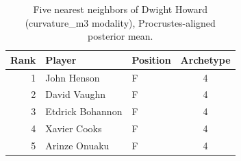 \begin{table}[htbp]
  \centering\small
  \begin{tabular}{rllc}
    \toprule
    Rank & Player & Position & Archetype \\
    \midrule
    1 & John Henson & F & 4 \\
    2 & David Vaughn & F & 4 \\
    3 & Etdrick Bohannon & F & 4 \\
    4 & Xavier Cooks & F & 4 \\
    5 & Arinze Onuaku & F & 4 \\
    \bottomrule
  \end{tabular}
  \caption{Five nearest neighbors of Dwight Howard (curvature_m3 modality), Procrustes-aligned posterior mean.}
  \label{tab:Dwight_Howard_neighbors_curvature_m3}
\end{table}

